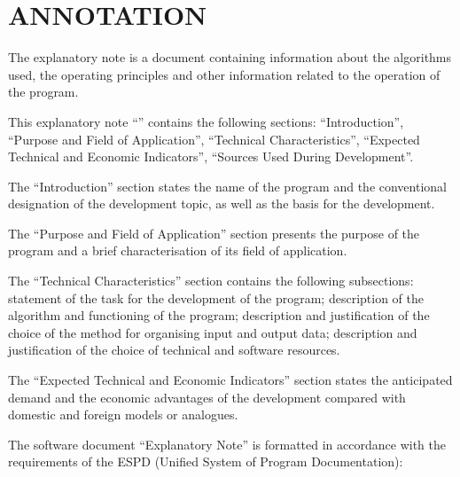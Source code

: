 \documentclass[12pt,a4paper]{extarticle}
\begin{document}
\sloppy




\section*{ANNOTATION}

The explanatory note is a document containing information about the algorithms used, the operating principles and other information related to the operation of the program.

This explanatory note \enquote{\hseProjectName} contains the following sections: \enquote{Introduction}, \enquote{Purpose and Field of Application}, \enquote{Technical Characteristics}, \enquote{Expected Technical and Economic Indicators}, \enquote{Sources Used During Development}.

The \enquote{Introduction} section states the name of the program and the conventional designation of the development topic, as well as the basis for the development.

The \enquote{Purpose and Field of Application} section presents the purpose of the program and a brief characterisation of its field of application.

The \enquote{Technical Characteristics} section contains the following subsections: statement of the task for the development of the program; description of the algorithm and functioning of the program; description and justification of the choice of the method for organising input and output data; description and justification of the choice of technical and software resources.

The \enquote{Expected Technical and Economic Indicators} section states the anticipated demand and the economic advantages of the development compared with domestic and foreign models or analogues.

\clearpage

\noindent
The software document \enquote{Explanatory Note} is formatted in accordance with the requirements of the ESPD (Unified System of Program Documentation):
\end{document}
